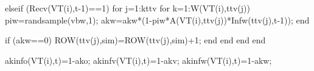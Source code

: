                                                         elseif (Recv(VT(i),t-1)==1)
                                                                    for j=1:kttv                                                                                                  
                                                                            for k=1:W(VT(i),ttv(j))                                 
                                                                                    piw=randsample(vbw,1);
                                                                                    akw=akw*(1-piw*A(VT(i),ttv(j))*Infw(ttv(j),t-1));                                                                 
                                                                            end
                                                                                                                   
                                                          
                                                                            if (akw==0)
                                                                                    ROW(ttv(j),sim)=ROW(ttv(j),sim)+1;
                                                                            end
                                                                    end                                           
                                                        end
                                          end
                                              
                                          
                                          
                                          akinfo(VT(i),t)=1-ako;
                                          akinfv(VT(i),t)=1-akv;
                                          akinfw(VT(i),t)=1-akw;
                                          
